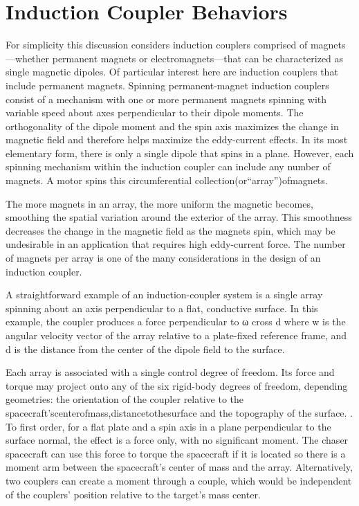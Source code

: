 \section{Induction Coupler Behaviors}

For simplicity this discussion considers induction couplers comprised of magnets—whether permanent magnets or electromagnets—that can be characterized as single magnetic dipoles. Of particular interest here are induction couplers that include permanent magnets. Spinning permanent-magnet induction couplers consist of a mechanism with one or more permanent magnets spinning with variable speed about axes perpendicular to their dipole moments. The orthogonality of the dipole moment and the spin axis maximizes the change in magnetic field and therefore helps maximize the eddy-current effects. In its most elementary form, there is only a single dipole that spins in a plane. However, each spinning mechanism within the induction coupler can include any number of magnets. A motor spins this circumferential collection‎(or‎“array”)‎of‎magnets.

The more magnets in an array, the more uniform the magnetic becomes, smoothing the spatial variation around the exterior of the array. This smoothness decreases the change in the magnetic field as the magnets spin, which may be undesirable in an application that requires high eddy-current force. The number of magnets per array is one of the many considerations in the design of an induction coupler.

A straightforward example of an induction-coupler system is a single array spinning about an axis perpendicular to a flat, conductive surface. In this example, the coupler produces a force perpendicular to ω cross d where w is the angular velocity vector of the array relative to a plate-fixed reference frame, and d is the distance from the center of the dipole field to the surface.

Each array is associated with a single control degree of freedom. Its force and torque may project onto any of the six rigid-body degrees of freedom, depending geometries: the orientation of the coupler relative to the spacecraft’s‎center‎of‎mass,‎distance‎to‎the‎surface and the topography of the surface. . To first order, for a flat plate and a spin axis in a plane perpendicular to the surface normal, the effect is a force only, with no significant moment. The chaser spacecraft can use this force to torque the spacecraft if it is located so there is a moment arm between the spacecraft's center of mass and the array. Alternatively, two couplers can create a moment through a couple, which would be independent of‎ the‎ couplers’‎ position‎ relative‎ to‎ the‎ target’s‎ mass‎ center.

